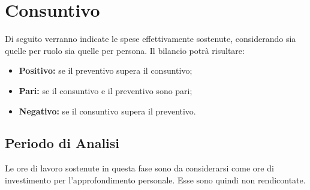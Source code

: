 \section{Consuntivo}
Di seguito verranno indicate le spese effettivamente sostenute, considerando sia quelle per ruolo sia quelle per persona. Il bilancio potrà risultare:
\begin{itemize}
	\item \textbf{Positivo:} se il preventivo supera il consuntivo;
	\item \textbf{Pari:} se il consuntivo e il preventivo sono pari;
	\item \textbf{Negativo:} se il consuntivo supera il preventivo.
\end{itemize}

\subsection{Periodo di Analisi}
Le ore di lavoro sostenute in questa fase sono da considerarsi come ore di investimento per l'approfondimento personale. Esse sono quindi non rendicontate.


